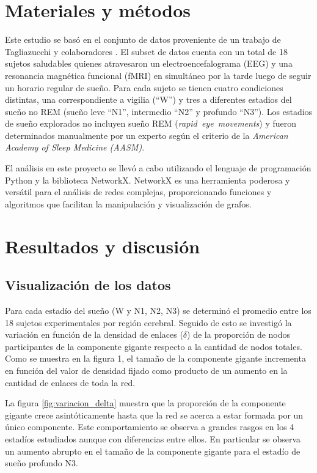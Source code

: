 \documentclass{article}
\begin{document}
\section{Materiales y métodos}
\label{gen_inst}

Este estudio se basó en el conjunto de datos proveniente de un trabajo de Tagliazucchi y colaboradores \cite{Tagliazucchi:2013aa}. El subset de datos cuenta con un total de 18 sujetos saludables quienes atravesaron un electroencefalograma (EEG) y una resonancia magnética funcional (fMRI) en simultáneo por la tarde luego de seguir un horario regular de sueño. Para cada sujeto se tienen cuatro condiciones distintas, una correspondiente a vigilia (``W'') y tres a diferentes estadios del sueño no REM (sueño leve ``N1'', intermedio ``N2'' y profundo ``N3''). Los estadios de sueño explorados no incluyen sueño REM (\textit{rapid\ eye\ movements}) y fueron determinados manualmente por un experto según el criterio de la \textit{American Academy of Sleep Medicine (AASM)}\cite{Berry:2015aa}.

El análisis en este proyecto se llevó a cabo utilizando el lenguaje de programación Python y la biblioteca NetworkX\cite{SciPyProceedings_11}. NetworkX es una herramienta poderosa y versátil para el análisis de redes complejas, proporcionando funciones y algoritmos que facilitan la manipulación y visualización de grafos.

\section{Resultados y discusión}
\label{headings}

\subsection{Visualización de los datos}

Para cada estadío del sueño (W y N1, N2, N3) se determinó el promedio entre los 18 sujetos experimentales por región cerebral. Seguido de esto se investigó la variación en función de la densidad de enlaces ($\delta$) de la proporción de nodos participantes de la componente gigante respecto a la cantidad de nodos totales. Como se muestra en la figura 1, el tamaño de la componente gigante incrementa en función del valor de densidad fijado como producto de un aumento en la cantidad de enlaces de toda la red.

La figura \ref{fig:variacion_delta} muestra que la proporción de la componente gigante crece asintóticamente hasta que la red se acerca a estar formada por un único componente. Este comportamiento se observa a grandes rasgos en los 4 estadíos estudiados aunque con diferencias entre ellos. En particular se observa un aumento abrupto en el tamaño de la componente gigante para el estadío de sueño profundo N3.
\end{document}
